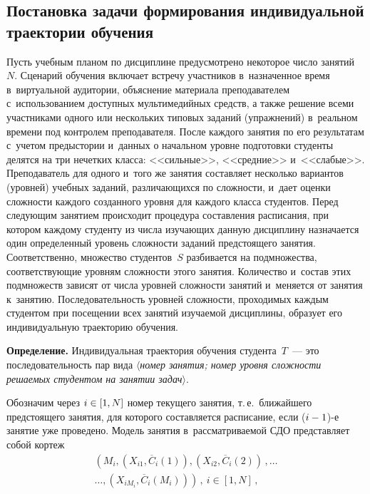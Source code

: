 \begin{multicols}{2}
\vspace*{-10pt}
  
\section{Постановка задачи формирования индивидуальной 
траектории обучения}
  
  Пусть учебным планом по дисциплине предусмотрено некоторое число 
занятий~$N$. Сценарий обучения включает встречу участников в~назначенное 
время в~виртуальной аудитории, объяснение материала преподавателем 
с~использованием доступных мультимедийных средств, а также решение всеми 
участниками одного или нескольких типовых заданий (упражнений) в~реальном 
времени под контролем преподавателя. После каждого занятия по его 
результатам с~учетом предыстории и~данных о начальном уровне подготовки 
студенты делятся на три нечетких класса: <<сильные>>, <<средние>> 
и~<<слабые>>. Преподаватель для одного и~того же занятия составляет несколько 
вариантов (уровней) учебных заданий, различающихся по слож\-ности, и~дает 
оценки сложности каждого созданного уровня для каждого класса студентов. 
Перед следующим занятием происходит процедура составления расписания, 
при котором каждому студенту из числа изучающих данную дисциплину 
назначается один определенный уровень сложности заданий предстоящего 
занятия. Соответственно, множество студентов~$S$ разбивается на 
подмножества, соответствующие уровням сложности этого занятия. 
Количество и~состав этих подмножеств зависят от чис\-ла уровней слож\-ности 
занятий и~меняется от занятия к~занятию. Последовательность уровней 
слож\-ности, проходимых каждым студентом при посещении всех занятий 
изучаемой дисциплины, образует его индивидуальную траекторию обучения.
  
  \smallskip
  
  \noindent
  \textbf{Определение.} Индивидуальная траектория обучения  
студента~$T$~--- это последовательность пар вида $\langle$\textit{номер 
занятия; номер уровня сложности ре\-ша\-емых студентом на занятии 
задач}$\rangle$.
  
  \smallskip
  
  Обозначим через $i\hm\in [1,N]$ номер текущего занятия, т.\,е.\ ближайшего 
предстоящего занятия, для которого составляется расписание, если  
($i\hm-1$)-е занятие уже проведено. Модель занятия в~рас\-смат\-ри\-ва\-емой СДО 
представляет собой кортеж 
  \begin{multline*}
  \left( M_i, \left( X_{i1},\overline{C}_i(1)\right), \left( 
X_{i2},\overline{C}_i(2)\right)\,,\ldots\right.\\
\left.\ldots , \left( X_{iM_i}, 
\overline{C}_i(M_i)\right)\right)\,,\ i\in [1,N]\,,
 \end{multline*}
 

\end{multicols}
